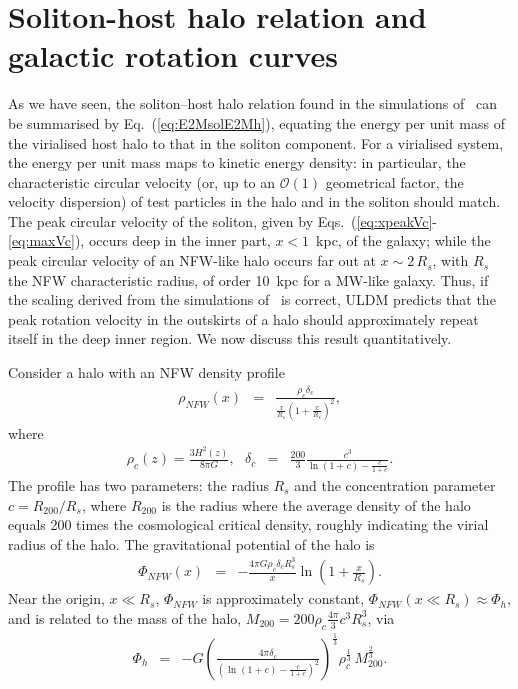 \documentclass[aps,prd,floats,superscriptaddress,showpacs,nofootinbib,twocolumn,preprintnumbers]{revtex4-1}%
\def\be{\begin{eqnarray}}
\def\ee{\end{eqnarray}}
\begin{document}
\section{Soliton-host halo relation and galactic rotation
  curves}\label{s:bhconsp} 
%
As we have seen, the soliton--host halo relation found in the
simulations of~\cite{Schive:2014hza,Schive:2014dra} can be summarised
by Eq.~(\ref{eq:E2MsolE2Mh}), equating the energy per unit mass of the
virialised host halo to that in the soliton component. For a
virialised system, the energy per unit mass maps to kinetic energy
density: in particular, the characteristic circular velocity (or, up
to an $\mathcal{O}(1)$ geometrical factor, the velocity dispersion) of
test particles in the halo and in the soliton should match. The peak
circular velocity of the soliton, given by
Eqs.~(\ref{eq:xpeakVc}-\ref{eq:maxVc}), occurs deep in the inner part,
$x<1$~kpc, of the galaxy; while the peak circular velocity of an
NFW-like halo occurs far out at $x\sim 2\,R_s$, with $R_s$ the NFW
characteristic radius, of order 10~kpc for a MW-like galaxy. Thus, if
the scaling derived from the simulations
of~\cite{Schive:2014hza,Schive:2014dra} is correct, ULDM predicts that
the peak rotation velocity in the outskirts of a halo should
approximately repeat itself in the deep inner region.  
We now discuss this result quantitatively. 


Consider a halo with an NFW density profile 
%
\be\rho_{NFW}(x)&=&\frac{\rho_c\delta_c}{\frac{x}{R_s}\left(1+\frac{x}{R_s}\right)^2},\ee
%
where 
%
\be\rho_c(z)=\frac{3H^2(z)}{8\pi G},\,\,\,\,\delta_c&=&\frac{200}{3}\frac{c^3}{\ln(1+c)-\frac{c}{1+c}}.\ee
%
The profile has two parameters: the radius $R_s$ and the concentration
parameter $c=R_{200}/R_s$, where $R_{200}$ is the radius where the
average density of the halo equals 200 times the cosmological critical
density, roughly indicating the virial radius of the halo.  
%
The gravitational potential of the halo is 
%
\be\Phi_{NFW}(x)&=&-\frac{4\pi G\rho_c\delta_c R_s^3}{x}\ln\left(1+\frac{x}{R_s}\right).\ee
%
Near the origin, $x\ll R_s$, $\Phi_{NFW}$ is approximately constant, $\Phi_{NFW}\left(x\ll R_s\right)\approx\Phi_h$, and is related to the mass of the halo, $M_{200}=200\rho_c\frac{4\pi}{3} c^3R_s^3$, via
%
\be\label{eq:PhiNFW}\Phi_h&=&-G\left(\frac{4\pi\delta_c}{\left(\ln(1+c)-\frac{c}{1+c}\right)^2}\right)^{\frac{1}{3}}\rho_c^{\frac{1}{3}}\,M_{200}^{\frac{2}{3}}.
\ee 
% 
\end{document}
